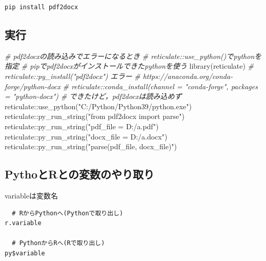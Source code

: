 \documentclass[
]{article}
\newenvironment{Shaded}{\begin{snugshade}}{\end{snugshade}}
\newcommand{\CommentTok}[1]{\textcolor[rgb]{0.56,0.35,0.01}{\textit{#1}}}
\newcommand{\FunctionTok}[1]{\textcolor[rgb]{0.00,0.00,0.00}{#1}}
\newcommand{\NormalTok}[1]{#1}
\newcommand{\SpecialCharTok}[1]{\textcolor[rgb]{0.00,0.00,0.00}{#1}}
\newcommand{\StringTok}[1]{\textcolor[rgb]{0.31,0.60,0.02}{#1}}
\begin{document}
\begin{verbatim}
pip install pdf2docx
\end{verbatim}

\hypertarget{ux5b9fux884c}{%
\subsection{実行}\label{ux5b9fux884c}}

\begin{Shaded}
\begin{Highlighting}[]
  \CommentTok{\# pdf2docxの読み込みでエラーになるとき}
  \CommentTok{\#   reticulate::use\_python()でpythonを指定}
  \CommentTok{\#   pipでpdf2docxがインストールできたpythonを使う}
\FunctionTok{library}\NormalTok{(reticulate)}
  \CommentTok{\# reticulate::py\_install("pdf2docx") エラー}
  \CommentTok{\# https://anaconda.org/conda{-}forge/python{-}docx}
  \CommentTok{\# reticulate::conda\_install(channel = "conda{-}forge", packages = "python{-}docx")  \# できたけど，pdf2docxは読み込めず}
\NormalTok{reticulate}\SpecialCharTok{::}\FunctionTok{use\_python}\NormalTok{(}\StringTok{"C:/Python/Python39/python.exe"}\NormalTok{)}
\NormalTok{reticulate}\SpecialCharTok{::}\FunctionTok{py\_run\_string}\NormalTok{(}\StringTok{"from pdf2docx import parse"}\NormalTok{)}
\NormalTok{reticulate}\SpecialCharTok{::}\FunctionTok{py\_run\_string}\NormalTok{(}\StringTok{"pdf\_file = \textquotesingle{}D:/a.pdf\textquotesingle{}"}\NormalTok{)}
\NormalTok{reticulate}\SpecialCharTok{::}\FunctionTok{py\_run\_string}\NormalTok{(}\StringTok{"docx\_file = \textquotesingle{}D:/a.docx\textquotesingle{}"}\NormalTok{)}
\NormalTok{reticulate}\SpecialCharTok{::}\FunctionTok{py\_run\_string}\NormalTok{(}\StringTok{"parse(pdf\_file, docx\_file)"}\NormalTok{)}
\end{Highlighting}
\end{Shaded}

\hypertarget{pythoux3068rux3068ux306eux5909ux6570ux306eux3084ux308aux53d6ux308a}{%
\subsection{PythoとRとの変数のやり取り}\label{pythoux3068rux3068ux306eux5909ux6570ux306eux3084ux308aux53d6ux308a}}

variableは変数名

\begin{verbatim}
  # RからPythonへ(Pythonで取り出し)
r.variable

  # PythonからRへ(Rで取り出し)
py$variable
\end{verbatim}
\end{document}
